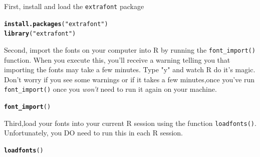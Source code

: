 \documentclass{tufte-book}\usepackage[]{graphicx}\usepackage[]{color}
\makeatletter
\newcommand{\hlstr}[1]{\textcolor[rgb]{0.192,0.494,0.8}{#1}}%
\newcommand{\hlstd}[1]{\textcolor[rgb]{0.345,0.345,0.345}{#1}}%
\newcommand{\hlkwd}[1]{\textcolor[rgb]{0.737,0.353,0.396}{\textbf{#1}}}%
\newenvironment{kframe}{%
 \def\at@end@of@kframe{}%
 \ifinner\ifhmode%
  \def\at@end@of@kframe{\end{minipage}}%
  \begin{minipage}{\columnwidth}%
 \fi\fi%
 \def\FrameCommand##1{\hskip\@totalleftmargin \hskip-\fboxsep
 \colorbox{shadecolor}{##1}\hskip-\fboxsep
     \hskip-\linewidth \hskip-\@totalleftmargin \hskip\columnwidth}%
 \MakeFramed {\advance\hsize-\width
   \@totalleftmargin\z@ \linewidth\hsize
   \@setminipage}}%
 {\par\unskip\endMakeFramed%
 \at@end@of@kframe}
\newenvironment{knitrout}{}{} %
\makeatother
\begin{document}
\begin{footnotesize}
First, install and load the \texttt{extrafont} package

\begin{knitrout}
\color{fgcolor}\begin{kframe}
\begin{alltt}
\hlkwd{install.packages}\hlstd{(}\hlstr{"extrafont"}\hlstd{)}
\hlkwd{library}\hlstd{(}\hlstr{"extrafont"}\hlstd{)}
\end{alltt}
\end{kframe}
\end{knitrout}

\begin{knitrout}
\color{fgcolor}\begin{kframe}


{\ttfamily\noindent\itshape\color{messagecolor}{\#\# Registering fonts with R}}\end{kframe}
\end{knitrout}


Second, import the fonts on your computer into R by running the \texttt{font\_import()} function. When you execute this, you'll receive a warning telling you that importing the fonts may take a few minutes. Type "y" and watch R do it's magic. Don't worry if you see some warnings or if it takes a few minutes,once you've run \texttt{font\_import()} once you \textit{won't} need to run it again on your machine.

\begin{knitrout}
\color{fgcolor}\begin{kframe}
\begin{alltt}
\hlkwd{font_import}\hlstd{()}
\end{alltt}
\end{kframe}
\end{knitrout}

Third,load your fonts into your current R session using the function \texttt{loadfonts()}. Unfortunately, you DO need to run this in each R session.

\begin{knitrout}
\color{fgcolor}\begin{kframe}
\begin{alltt}
\hlkwd{loadfonts}\hlstd{()}
\end{alltt}
\end{kframe}
\end{knitrout}



\end{footnotesize}
\end{document}
